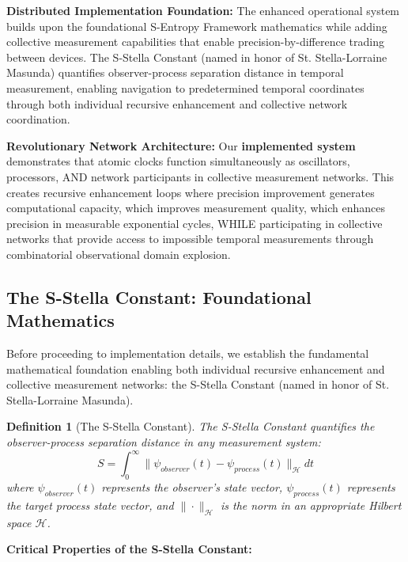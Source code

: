 \documentclass[12pt,a4paper]{article}
\newtheorem{definition}[theorem]{Definition}
\begin{document}
\textbf{Distributed Implementation Foundation:} The enhanced operational system builds upon the foundational S-Entropy Framework mathematics while adding collective measurement capabilities that enable precision-by-difference trading between devices. The S-Stella Constant (named in honor of St. Stella-Lorraine Masunda) quantifies observer-process separation distance in temporal measurement, enabling navigation to predetermined temporal coordinates through both individual recursive enhancement and collective network coordination.

\textbf{Revolutionary Network Architecture:} Our \textbf{implemented system} demonstrates that atomic clocks function simultaneously as oscillators, processors, AND network participants in collective measurement networks. This creates recursive enhancement loops where precision improvement generates computational capacity, which improves measurement quality, which enhances precision in measurable exponential cycles, WHILE participating in collective networks that provide access to impossible temporal measurements through combinatorial observational domain explosion.

\subsection{The S-Stella Constant: Foundational Mathematics}

Before proceeding to implementation details, we establish the fundamental mathematical foundation enabling both individual recursive enhancement and collective measurement networks: the S-Stella Constant (named in honor of St. Stella-Lorraine Masunda).

\begin{definition}[The S-Stella Constant]
The S-Stella Constant quantifies the observer-process separation distance in any measurement system:
$$S = \int_0^{\infty} \|\psi_{observer}(t) - \psi_{process}(t)\|_{\mathcal{H}} dt$$
where $\psi_{observer}(t)$ represents the observer's state vector, $\psi_{process}(t)$ represents the target process state vector, and $\|\cdot\|_{\mathcal{H}}$ is the norm in an appropriate Hilbert space $\mathcal{H}$.
\end{definition}

\textbf{Critical Properties of the S-Stella Constant:}
\end{document}
